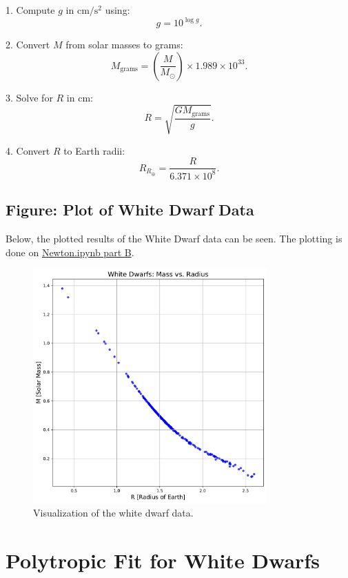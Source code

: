 \documentclass[12pt]{article}
\begin{document}
1. Compute \(g\) in \(\mathrm{cm/s^2}\) using:
   \[
   g = 10^{\log g}.
   \]

2. Convert \(M\) from solar masses to grams:
   \[
   M_{\mathrm{grams}} = \left(\frac{M}{M_\odot}\right) \times 1.989 \times 10^{33}.
   \]

3. Solve for \(R\) in \(\mathrm{cm}\):
   \[
   R = \sqrt{\frac{G M_{\mathrm{grams}}}{g}}.
   \]

4. Convert \(R\) to Earth radii:
   \[
   R_{R_\oplus} = \frac{R}{6.371 \times 10^8}.
   \]

\subsection{Figure: Plot of White Dwarf Data}

Below, the plotted results of the White Dwarf data can be seen. The plotting is done on \href{Newton.ipynb}{Newton.ipynb part B}.

\begin{figure}[h!]
    \centering
    \includegraphics[width=0.8\textwidth]{Newton_PartB_WhiteDwarfDataFitting.pdf}
    \caption{Visualization of the white dwarf data.}
    \label{fig:newton-partb}
\end{figure}

\clearpage %

\section{Polytropic Fit for White Dwarfs}
\end{document}
